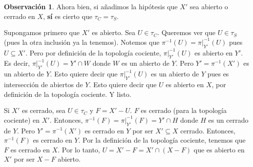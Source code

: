 \documentclass[12pt]{book}
\theoremstyle{definition}
\newtheorem{obs}[teo]{Observación}
\begin{document}
\begin{obs}
Ahora bien, si añadimos la hipótesis que $X'$ sea abierto o cerrado en $X$, \textbf{sí} es cierto que $\tau_C = \tau_S$. 

Supongamos primero que $X'$ es abierto. Sea $U\in\tau_C$. Queremos ver que $U\in\tau_S$ (pues la otra inclusión ya la tenemos). Notemos que $\pi^{-1}(U) = \left.\pi\right|_{Y'}^{-1}(U)$ pues $U\subseteq X'$. Pero por definición de la topología cociente, $\left.\pi\right|_{Y'}^{-1}(U)$ es abierto en $Y'$. Es decir, $\left.\pi\right|_{Y'}^{-1}(U) = Y'\cap W$ donde $W$ es un abierto de $Y$. Pero $Y'=\pi^{-1}(X')$ es un abierto de $Y$. Esto quiere decir que $\left.\pi\right|_{Y'}^{-1}(U)$ es un abierto de $Y$ pues es intersección de abiertos de $Y$. Esto quiere decir que $U$ es abierto en $X$, por definición de la topología cociente. Y listo.

Si $X'$ es cerrado, sea $U\in\tau_C$ y $F=X'-U$. $F$ es cerrado (para la topología cociente) en $X'$. Entonces, $\pi^{-1}(F) = \left.\pi\right|_{Y'}^{-1} (F) = Y'\cap H$ donde $H$ es un cerrado de $Y$. Pero $Y'=\pi^{-1}(X')$ es cerrado en $Y$ por ser $X'\subseteq X$ cerrado. Entonces, $\pi^{-1}(F)$ es cerrado en $Y$. Por la definición de la topología cociente, tenemos que $F$ es cerrado en $X$. Por lo tanto, $U=X' - F = X'\cap (X-F)$ que es abierto en $X'$ por ser $X-F$ abierto.
\end{obs}
\end{document}
